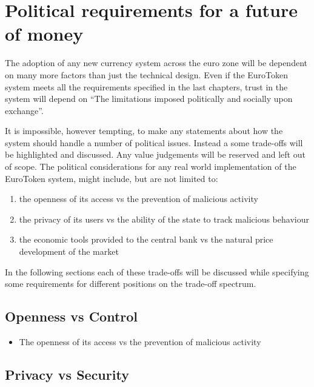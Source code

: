 \documentclass[whitelogo]{tudelft-report}
\providecommand{\tightlist}{%
  \setlength{\itemsep}{0pt}\setlength{\parskip}{0pt}}
\begin{document}
\section{Political requirements for a future of
money}\label{political-requirements-for-a-future-of-money}

The adoption of any new currency system across the euro zone will be
dependent on many more factors than just the technical design. Even if
the EuroToken system meets all the requirements specified in the last
chapters, trust in the system will depend on ``The limitations imposed
politically and socially upon exchange''.

It is impossible, however tempting, to make any statements about how the
system should handle a number of political issues. Instead a some
trade-offs will be highlighted and discussed. Any value judgements will
be reserved and left out of scope. The political considerations for any
real world implementation of the EuroToken system, might include, but
are not limited to:

\begin{enumerate}
\def\labelenumi{\arabic{enumi}.}
\tightlist
\item
  the openness of its access vs the prevention of malicious activity
\item
  the privacy of its users vs the ability of the state to track
  malicious behaviour
\item
  the economic tools provided to the central bank vs the natural price
  development of the market
\end{enumerate}

In the following sections each of these trade-offs will be discussed
while specifying some requirements for different positions on the
trade-off spectrum.

\subsection{Openness vs Control}\label{openness-vs-control}

\begin{itemize}
\tightlist
\item
  The openness of its access vs the prevention of malicious activity
\end{itemize}

\subsection{Privacy vs Security}\label{privacy-vs-security}
\end{document}
